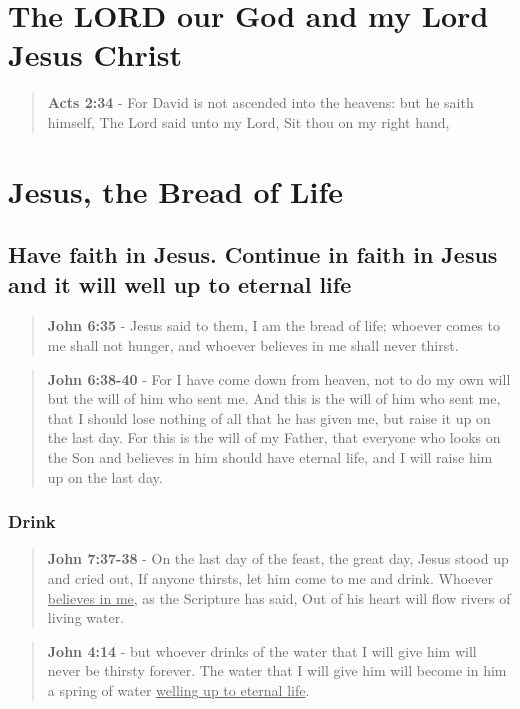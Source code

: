 \documentclass[11pt]{article}
\begin{document}
\section{The LORD our God and my Lord Jesus Christ}
\label{sec:orge0eab36}
\begin{quote}
\textbf{Acts 2:34} - For David is not ascended into the heavens: but he saith himself, The Lord said unto my Lord, Sit thou on my right hand,
\end{quote}

\section{Jesus, the Bread of Life}
\label{sec:org482c9bb}
\subsection{Have faith in Jesus. Continue in faith in Jesus and it will well up to eternal life}
\label{sec:org8084701}
\begin{quote}
\textbf{John 6:35} - Jesus said to them, I am the bread of life; whoever comes to me shall not hunger, and whoever believes in me shall never thirst.
\end{quote}

\begin{quote}
\textbf{John 6:38-40} - For I have come down from heaven, not to do my own will but the will of him who sent me. And this is the will of him who sent me, that I should lose nothing of all that he has given me, but raise it up on the last day. For this is the will of my Father, that everyone who looks on the Son and believes in him should have eternal life, and I will raise him up on the last day.
\end{quote}

\subsubsection{Drink}
\label{sec:orgcca9001}
\begin{quote}
\textbf{John 7:37-38} - On the last day of the feast, the great day, Jesus stood up and cried out, If anyone thirsts, let him come to me and drink. Whoever \uline{believes in me}, as the Scripture has said, Out of his heart will flow rivers of living water.
\end{quote}

\begin{quote}
\textbf{John 4:14} - but whoever drinks of the water that I will give him will never be thirsty forever. The water that I will give him will become in him a spring of water \uline{welling up to eternal life}.
\end{quote}
\end{document}
